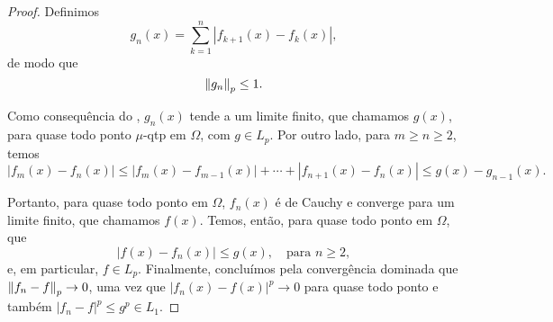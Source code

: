\begin{proof}
    Definimos
    \begin{equation*}
        g_n(x) = \sum_{k=1}^n |f_{k+1}(x) - f_k(x)|,
    \end{equation*}
    de modo que
    \begin{equation*}
        \left\lVert g_n \right\rVert_p \leq 1.
    \end{equation*}

    Como consequência do , $g_n(x)$ tende a um limite finito, que chamamos $g(x)$, para quase todo ponto \(\mu\)-qtp em $\Omega$, com $g \in L_p$. Por outro lado, para $m \geq n \geq 2$, temos
    \begin{equation*}
        |f_m(x) - f_n(x)| \leq |f_m(x) - f_{m-1}(x)| + \cdots + |f_{n+1}(x) - f_n(x)| \leq g(x) - g_{n-1}(x).
    \end{equation*}

    Portanto, para quase todo ponto em $\Omega$, $f_n(x)$ é de Cauchy e converge para um limite finito, que chamamos $f(x)$. Temos, então, para quase todo ponto em $\Omega$, que
    \begin{equation*}
        |f(x) - f_n(x)| \leq g(x), \quad \text{para } n \geq 2,
    \end{equation*}
    e, em particular, $f \in L_p$. Finalmente, concluímos pela convergência dominada que $\left\lVert f_n - f \right\rVert_p \to 0$, uma vez que $|f_n(x) - f(x)|^p \to 0$ para quase todo ponto e também $|f_n - f|^p \leq g^p \in L_1$.
\end{proof}
